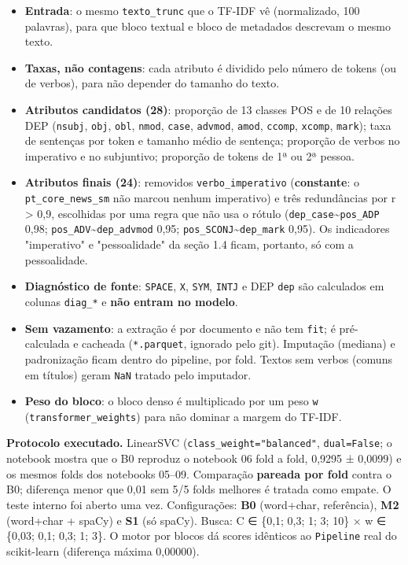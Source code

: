 \documentclass[
  brazilian,
  11pt,
]{article}
\providecommand{\tightlist}{%
  \setlength{\itemsep}{0pt}\setlength{\parskip}{0pt}}
\begin{document}
\begin{itemize}
\tightlist
\item
  \textbf{Entrada}: o mesmo \texttt{texto\_trunc} que o TF-IDF vê (normalizado, 100 palavras), para que bloco textual e bloco de metadados descrevam o mesmo texto.
\item
  \textbf{Taxas, não contagens}: cada atributo é dividido pelo número de tokens (ou de verbos), para não depender do tamanho do texto.
\item
  \textbf{Atributos candidatos (28)}: proporção de 13 classes POS e de 10 relações DEP (\texttt{nsubj}, \texttt{obj}, \texttt{obl}, \texttt{nmod}, \texttt{case}, \texttt{advmod}, \texttt{amod}, \texttt{ccomp}, \texttt{xcomp}, \texttt{mark}); taxa de sentenças por token e tamanho médio de sentença; proporção de verbos no imperativo e no subjuntivo; proporção de tokens de 1ª ou 2ª pessoa.
\item
  \textbf{Atributos finais (24)}: removidos \texttt{verbo\_imperativo} (\textbf{constante}: o \texttt{pt\_core\_news\_sm} não marcou nenhum imperativo) e três redundâncias por \textbar r\textbar{} \textgreater{} 0,9, escolhidas por uma regra que não usa o rótulo (\texttt{dep\_case}\textasciitilde{}\texttt{pos\_ADP} 0,98; \texttt{pos\_ADV}\textasciitilde{}\texttt{dep\_advmod} 0,95; \texttt{pos\_SCONJ}\textasciitilde{}\texttt{dep\_mark} 0,95). Os indicadores "imperativo" e "pessoalidade" da seção 1.4 ficam, portanto, só com a pessoalidade.
\item
  \textbf{Diagnóstico de fonte}: \texttt{SPACE}, \texttt{X}, \texttt{SYM}, \texttt{INTJ} e DEP \texttt{dep} são calculados em colunas \texttt{diag\_*} e \textbf{não entram no modelo}.
\item
  \textbf{Sem vazamento}: a extração é por documento e não tem \texttt{fit}; é pré-calculada e cacheada (\texttt{*.parquet}, ignorado pelo git). Imputação (mediana) e padronização ficam dentro do pipeline, por fold. Textos sem verbos (comuns em títulos) geram \texttt{NaN} tratado pelo imputador.
\item
  \textbf{Peso do bloco}: o bloco denso é multiplicado por um peso \texttt{w} (\texttt{transformer\_weights}) para não dominar a margem do TF-IDF.
\end{itemize}

\textbf{Protocolo executado.} LinearSVC (\texttt{class\_weight="balanced"}, \texttt{dual=False}; o notebook mostra que o B0 reproduz o notebook 06 fold a fold, 0,9295 ± 0,0099) e os mesmos folds dos notebooks 05--09. Comparação \textbf{pareada por fold} contra o B0; diferença menor que 0,01 sem 5/5 folds melhores é tratada como empate. O teste interno foi aberto uma vez. Configurações: \textbf{B0} (word+char, referência), \textbf{M2} (word+char + spaCy) e \textbf{S1} (só spaCy). Busca: C ∈ \{0,1; 0,3; 1; 3; 10\} × w ∈ \{0,03; 0,1; 0,3; 1; 3\}. O motor por blocos dá scores idênticos ao \texttt{Pipeline} real do scikit-learn (diferença máxima 0,00000).
\end{document}
